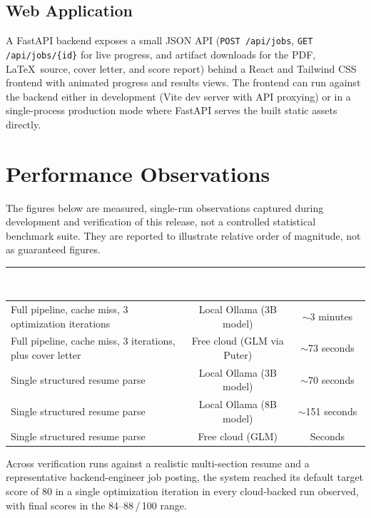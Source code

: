 \documentclass[10.5pt,letterpaper]{article}
\begin{document}
\subsection{Web Application}
A FastAPI backend exposes a small JSON API (\texttt{POST /api/jobs},
\texttt{GET /api/jobs/\{id\}} for live progress, and artifact downloads for the PDF, \LaTeX\
source, cover letter, and score report) behind a React and Tailwind CSS frontend with
animated progress and results views. The frontend can run against the backend either in
development (Vite dev server with API proxying) or in a single-process production mode where
FastAPI serves the built static assets directly.

\newpage

\section{Performance Observations}

\begin{calloutbox}
The figures below are measured, single-run observations captured during development and
verification of this release, not a controlled statistical benchmark suite. They are
reported to illustrate relative order of magnitude, not as guaranteed figures.
\end{calloutbox}

\begin{tabularx}{\textwidth}{@{}X c c@{}}
\toprule
\rowcolor{brandIndigoDark}
\textcolor{white}{\textbf{Scenario}} & \textcolor{white}{\textbf{Backend}} &
\textcolor{white}{\textbf{Observed Time}} \\
\midrule
Full pipeline, cache miss, 3 optimization iterations
  & Local Ollama (3B model) & $\sim$3 minutes \\
\rowcolor{brandBgGray}
Full pipeline, cache miss, 3 iterations, plus cover letter
  & Free cloud (GLM via Puter) & $\sim$73 seconds \\
Single structured resume parse & Local Ollama (3B model) & $\sim$70 seconds \\
\rowcolor{brandBgGray}
Single structured resume parse & Local Ollama (8B model) & $\sim$151 seconds \\
Single structured resume parse & Free cloud (GLM) & Seconds \\
\bottomrule
\end{tabularx}

\vspace{0.4cm}
Across verification runs against a realistic multi-section resume and a representative
backend-engineer job posting, the system reached its default target score of 80 in a single
optimization iteration in every cloud-backed run observed, with final scores in the
84--88\,/\,100 range.
\end{document}
